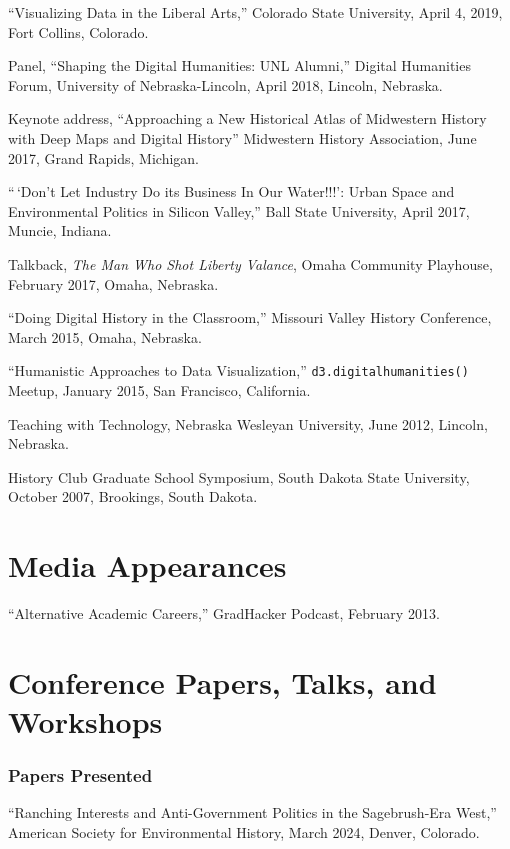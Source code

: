 ``Visualizing Data in the Liberal Arts,'' Colorado State University,
April 4, 2019, Fort Collins, Colorado.

Panel, ``Shaping the Digital Humanities: UNL Alumni,'' Digital
Humanities Forum, University of Nebraska-Lincoln, April 2018, Lincoln,
Nebraska.

Keynote address, ``Approaching a New Historical Atlas of Midwestern
History with Deep Maps and Digital History'' Midwestern History
Association, June 2017, Grand Rapids, Michigan.

``\,`Don't Let Industry Do its Business In Our Water!!!': Urban Space
and Environmental Politics in Silicon Valley,'' Ball State University,
April 2017, Muncie, Indiana.

Talkback, \emph{The Man Who Shot Liberty Valance}, Omaha Community
Playhouse, February 2017, Omaha, Nebraska.

``Doing Digital History in the Classroom,'' Missouri Valley History
Conference, March 2015, Omaha, Nebraska.

``Humanistic Approaches to Data Visualization,''
\texttt{d3.digitalhumanities()} Meetup, January 2015, San Francisco,
California.

Teaching with Technology, Nebraska Wesleyan University, June 2012,
Lincoln, Nebraska.

History Club Graduate School Symposium, South Dakota State University,
October 2007, Brookings, South Dakota.

\section{Media Appearances}\label{media-appearances}

``Alternative Academic Careers,'' GradHacker Podcast, February 2013.

\section{Conference Papers, Talks, and
Workshops}\label{conference-papers-talks-and-workshops}

\subsubsection{Papers Presented}\label{papers-presented}

``Ranching Interests and Anti-Government Politics in the Sagebrush-Era
West,'' American Society for Environmental History, March 2024, Denver,
Colorado.

